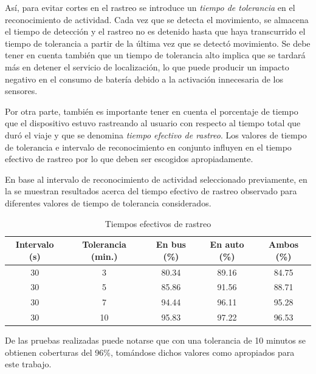 Así, para evitar cortes en el rastreo se introduce un \emph{tiempo de tolerancia} en el reconocimiento de actividad. Cada vez que se detecta el movimiento, se almacena el tiempo de detección y el rastreo no es detenido hasta que haya transcurrido el tiempo de tolerancia a partir de la última vez que se detectó movimiento. Se debe tener en cuenta también que un tiempo de tolerancia alto implica que se tardará más en detener el servicio de localización, lo que puede producir un impacto negativo en el consumo de batería debido a la activación innecesaria de los sensores.

Por otra parte, también es importante tener en cuenta el porcentaje de tiempo que el dispositivo estuvo rastreando al usuario con respecto al tiempo total que duró el viaje y que se denomina \emph{tiempo efectivo de rastreo}. Los valores de tiempo de tolerancia e intervalo de reconocimiento en conjunto influyen en el tiempo efectivo de rastreo por lo que deben ser escogidos apropiadamente.

En base al intervalo de reconocimiento de actividad seleccionado previamente, en la  se muestran resultados acerca del tiempo efectivo de rastreo observado para diferentes valores de tiempo de tolerancia considerados. 

\begin{table}[h]
    \centering
	\begin{tabular}{ccccc}
    	\toprule
    	Intervalo (s) & Tolerancia (min.) & En bus (\%) & En auto (\%) & Ambos (\%) \\
    	\midrule
    	30            & 3                 & 80.34         & 89.16          & 84.75        \\
    	30            & 5                 & 85.86         & 91.56          & 88.71		\\
    	30            & 7                & 94.44         & 96.11          & 95.28        \\
    	30            & 10                & 95.83         & 97.22          & 96.53        \\
    	\bottomrule
	\end{tabular}
    \caption{Tiempos efectivos de rastreo}
    \label{tab:prom_tiempo_efectivo_rastreo}
\end{table}

De las pruebas realizadas puede notarse que con una tolerancia de 10 minutos se obtienen coberturas del 96\%, tomándose dichos valores como apropiados para este trabajo.

